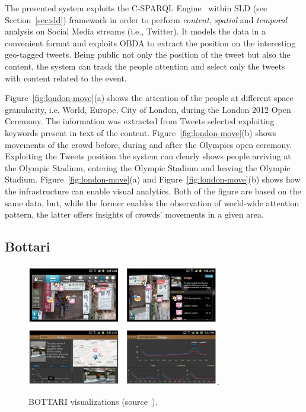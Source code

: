 The presented system exploits the C-SPARQL Engine~\cite{DBLP:journals/ijsc/BarbieriBCVG10} within SLD (see Section~\ref{sec:sld}) framework in order to perform \textit{content}, \textit{spatial} and \textit{temporal} analysis on Social Media streams (i.e., Twitter). 
It models the data in a convenient format and exploits OBDA to extract the position on the interesting geo-tagged tweets. 
Being public not only the position of the tweet but also the content, the system can track the people attention and select only the tweets with content related to the event. 

Figure~\ref{fig:london-move}(a) shows the attention of the people at different space granularity, i.e. World, Europe, City of London, during the London 2012 Open Ceremony. The information was extracted from Tweets selected exploiting keywords present in text of the content.
Figure~\ref{fig:london-move}(b) shows movements of the crowd before, during and after the Olympics open ceremony. Exploiting the Tweets position the system can clearly shows people arriving at the Olympic Stadium, entering the Olympic Stadium and leaving the Olympic Stadium.
Figure~\ref{fig:london-move}(a) and Figure~\ref{fig:london-move}(b) shows how the infrastructure can enable visual analytics. 
Both of the figure are based on the same data, but, while the former enables the observation of world-wide attention pattern, the latter offers insights of crowds' movements in a given area.

\subsection{Bottari} \label{sec:uda-bottari}

\begin{figure}[t]
	\centering
	\includegraphics[width=0.75\textwidth]{img/bottari2.pdf}.
    \caption{BOTTARI visualizations (source~\cite{DBLP:conf/semweb/BalduiniVDTPC13}).}
    \label{fig:bottari-vis}
\end{figure}

